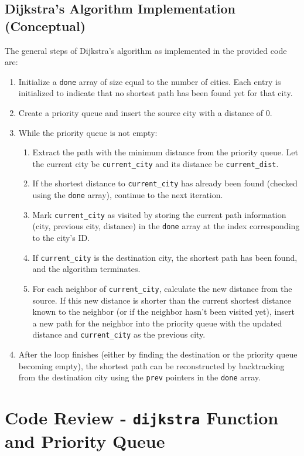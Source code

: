 \documentclass[a4paper,11pt]{article}
\begin{document}
\subsection*{Dijkstra's Algorithm Implementation (Conceptual)}
The general steps of Dijkstra's algorithm as implemented in the provided code are:

\begin{enumerate}
    \item Initialize a \texttt{done} array of size equal to the number of cities. Each entry is initialized to indicate that no shortest path has been found yet for that city.
    \item Create a priority queue and insert the source city with a distance of 0.
    \item While the priority queue is not empty:
    \begin{enumerate}
        \item Extract the path with the minimum distance from the priority queue. Let the current city be \texttt{current\_city} and its distance be \texttt{current\_dist}.
        \item If the shortest distance to \texttt{current\_city} has already been found (checked using the \texttt{done} array), continue to the next iteration.
        \item Mark \texttt{current\_city} as visited by storing the current path information (city, previous city, distance) in the \texttt{done} array at the index corresponding to the city's ID.
        \item If \texttt{current\_city} is the destination city, the shortest path has been found, and the algorithm terminates.
        \item For each neighbor of \texttt{current\_city}, calculate the new distance from the source. If this new distance is shorter than the current shortest distance known to the neighbor (or if the neighbor hasn't been visited yet), insert a new path for the neighbor into the priority queue with the updated distance and \texttt{current\_city} as the previous city.
    \end{enumerate}
    \item After the loop finishes (either by finding the destination or the priority queue becoming empty), the shortest path can be reconstructed by backtracking from the destination city using the \texttt{prev} pointers in the \texttt{done} array.
\end{enumerate}

\section*{Code Review - \texttt{dijkstra} Function and Priority Queue}
\end{document}
